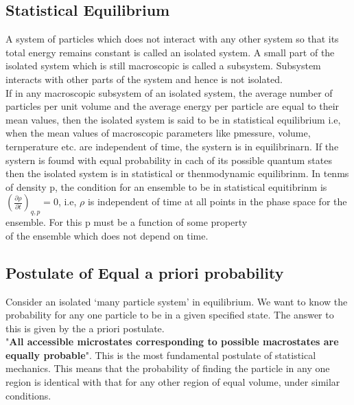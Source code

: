 \subsection{Statistical Equilibrium}
A system of particles which does not interact with any other system so that its total energy remains constant is called an isolated system. A small part of the isolated system which is still macroscopic is called a subsystem. Subsystem interacts with other parts of the system and hence is not isolated.\\
If in any macroscopic subsystem of an isolated system, the average number of particles per unit volume and the average energy per particle are equal to their mean values, then the isolated system is said to be in statistical equilibrium i.e, when the mean values of macroscopic parameters like pmessure, volume, ternperature etc. are independent of time, the systern is in equilibrinarn. If the systern is foumd with equal probability in cach of its possible quantum states then the isolated system is in statistical or thenmodynamic equilibrinm. In tenms of density p, the condition for an ensemble to be in statistical equitibrinm is $\left(\frac{\partial \rho}{\partial t}\right)_{q, p}=0$, i.e, $\rho$ is independent of time at all points in the phase space for the ensemble. For this p must be a function of some property\\
of the ensemble which does not depend on time.
\subsection{Postulate of Equal a priori probability}
Consider an isolated `many particle system' in equilibrium. We want to know the probability for any one particle to be in a given specified state. The answer to this is given by the a priori postulate.\\
"\textbf{All accessible microstates corresponding to possible macrostates are equally probable}". This is the most fundamental postulate of statistical mechanics. This means that the probability of finding the particle in any one region is identical with that for any other region of equal volume, under similar conditions.




